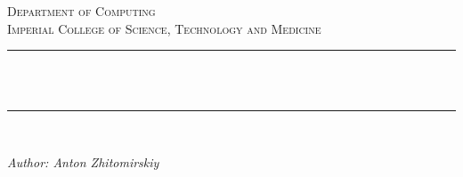 \begin{titlepage}

    \newcommand{\HRule}{\rule{\linewidth}{0.5mm}} %
    
    \center %
     
    
    \textsc{\Large Department of Computing}\\[0.5cm] 
    \textsc{\large Imperial College of Science, Technology and Medicine}\\[0.5cm] 
    
    
    \HRule \\[0.4cm]
    { \huge \bfseries \reporttitle}\\ %
    \HRule \\[0.4cm]

    \textit{\reportdescription}
    
    \vspace{2em}

    
    \large \emph{Author: Anton Zhitomirskiy}

    \vspace{3em}

    \global\let\newpagegood\newpage
    \global\let\newpage\relax
    
\end{titlepage}

\global\let\newpage\newpagegood